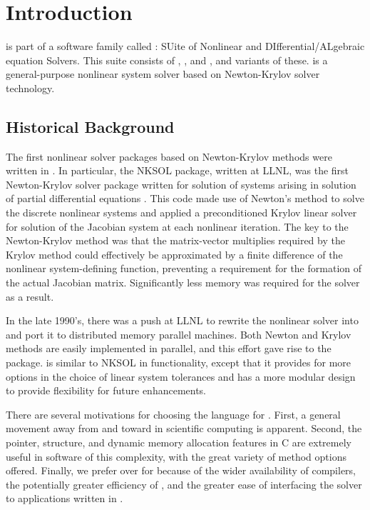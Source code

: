 \chapter{Introduction}\label{s:intro}

{\kinsol} is part of a software family called {\sundials}: SUite
of Nonlinear and DIfferential/ALgebraic equation Solvers. This
suite consists of {\cvode}, {\kinsol}, and {\ida}, and variants of
these.
%
{\kinsol} is a
general-purpose nonlinear system solver based on Newton-Krylov
solver technology.

\section{Historical Background}\label{ss:history}

  The first
nonlinear solver packages based on Newton-Krylov methods were
written in {\F}.  In particular, the NKSOL package, written at
LLNL, was the first Newton-Krylov solver package written for
solution of systems arising in solution of partial differential
equations \cite{BrSa:90}.  This {\F} code made use of Newton's
method to solve the discrete nonlinear systems and applied a
preconditioned Krylov linear solver for solution of the Jacobian
system at each nonlinear iteration.  The key to the Newton-Krylov
method was that the matrix-vector multiplies required by the
Krylov method could effectively be approximated by a finite
difference of the nonlinear system-defining function, preventing a
requirement for the formation of the actual Jacobian matrix.
Significantly less memory was required for the solver as a result.

In the late 1990's, there was a push at LLNL to rewrite the
nonlinear solver into {\C} and port it to distributed memory
parallel machines.  Both Newton and Krylov methods are easily
implemented in parallel, and this effort gave rise to the
{\kinsol} package. {\kinsol} is similar to NKSOL in functionality,
except that it provides for more options in the choice of linear
system tolerances and has a more modular design to provide
flexibility for future enhancements.

 There are
several motivations for choosing the {\C} language for {\kinsol}.
First, a general movement away from {\F} and toward {\C} in
scientific computing is apparent. Second, the pointer, structure,
and dynamic memory allocation features in C are extremely useful
in software of this complexity, with the great variety of method
options offered. Finally, we prefer {\C} over {\CPP} for {\kinsol}
because of the wider availability of {\C} compilers, the
potentially greater efficiency of {\C}, and the greater ease of
interfacing the solver to applications written in {\F}.

